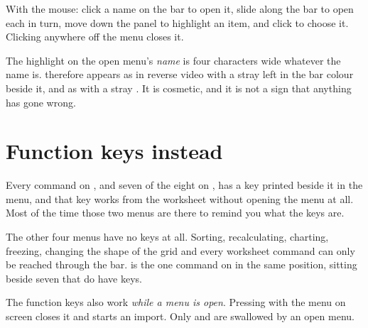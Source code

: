 With the mouse: click a name on the bar to open it, slide along the bar to open
each in turn, move down the panel to highlight an item, and click to choose it.
Clicking anywhere off the menu closes it.

\begin{ccfigure}
\caption{The  menu, with  highlighted}
\label{fig:filemenu}
\end{ccfigure}

\begin{ccnote}
The highlight on the open menu's \emph{name} is four characters wide whatever
the name is.  therefore appears as  in reverse video
with a stray  left in the bar colour beside it, and  as
 with a stray . It is cosmetic, and it is not a sign that
anything has gone wrong.
\end{ccnote}

\section{Function keys instead}

Every command on , and seven of the eight on ,
has a key printed beside it in the menu, and that key works from the worksheet
without opening the menu at all. Most of the time those two menus are there to
remind you what the keys are.

The other four menus have no keys at all. Sorting, recalculating, charting,
freezing, changing the shape of the grid and every worksheet command can only be
reached through the bar.  is the one command on
 in the same position, sitting beside seven that do have keys.

\begin{ccnote}
The function keys also work \emph{while a menu is open}. Pressing  with
the  menu on screen closes it and starts an import. Only
 and  are swallowed by an open menu.
\end{ccnote}

